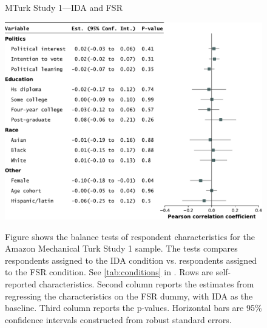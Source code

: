 \begin{center}
	\begin{figure}
		\centering
		\caption{MTurk Study 1---IDA and FSR}
		\includegraphics[width=\textwidth]{../figs/study1-baltest-FSR-ips.pdf}
		\label{fig:baltest-24k-rw}
		\caption*{\footnotesize 
			Figure shows the balance tests of respondent characteristics for the Amazon Mechanical Turk Study 1 sample.
			The tests compares respondents assigned to the IDA condition vs. respondents assigned to the FSR condition.
			See \cref{tab:conditions} in .
			Rows are self-reported characteristics.
			Second column reports the estimates from regressing the characteristics on the FSR dummy, with IDA as the baseline.
			Third column reports the p-values.
			Horizontal bars are 95\% confidence intervals constructed from robust standard errors.
		}
	\end{figure}
\end{center}

